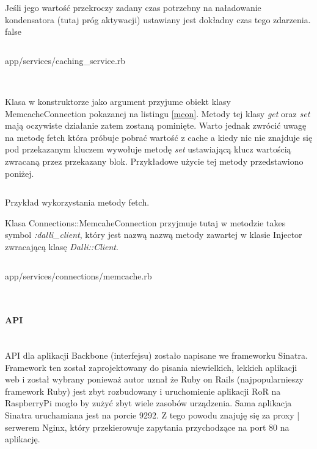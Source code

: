 \documentclass[11pt,a4paper, twoside]{article}
\begin{document}
Jeśli jego wartość przekroczy zadany czas potrzebny na naładowanie kondensatora (tutaj próg aktywacji) ustawiany jest dokładny czas tego zdarzenia. %
\if false
\newpage
\begin{listing}[H]
\inputminted[linenos=true]{ruby}{./src/cachingservice.rb}
\caption{app/services/caching\_service.rb}
$\label{caching}$
\end{listing}
\noindent
Klasa w konstruktorze jako argument przyjume obiekt klasy \mbox{MemcacheConnection} pokazanej na listingu \ref{mcon}. Metody tej klasy \emph{get} oraz \emph{set} mają oczywiste działanie zatem zostaną pominięte. Warto jednak zwrócić uwagę na metodę fetch która próbuje pobrać wartość z cache a kiedy nic nie znajduje się pod przekazanym kluczem wywołuje metodę \emph{set} ustawiającą klucz wartością zwracaną przez przekazany blok. Przykładowe użycie tej metody przedstawiono poniżej.
\begin{listing}
\inputminted[linenos=true]{ruby}{./src/fetch.rb}
\caption{Przykład wykorzystania metody fetch.}
\end{listing}
\newpage
\noindent
Klasa Connections::MemcaheConnection przyjmuje tutaj w metodzie takes symbol \emph{:dalli\_client}, który jest nazwą nazwą metody zawartej w klasie Injector zwracającą klasę \emph{Dalli::Client}.
\begin{listing}
\inputminted[linenos=true]{ruby}{./src/memcache.rb}
\caption{app/services/connections/memcache.rb}
$\label{mcon}$
\end{listing}
\fi
\newpage
\paragraph{API} ~\\
API dla aplikacji Backbone (interfejsu) zostało napisane we frameworku Sinatra. Framework ten został  zaprojektowany do pisania niewielkich, lekkich aplikacji web i został wybrany ponieważ autor uznał że Ruby on Rails (najpopularnieszy framework Ruby) jest zbyt rozbudowany i uruchomienie aplikacji RoR na RaspberryPi mogło by zużyć zbyt wiele zasobów urządzenia. Sama aplikacja Sinatra uruchamiana jest na porcie 9292. Z tego powodu znajuję się za proxy | serwerem Nginx, który przekierowuje zapytania przychodzące na port 80 na aplikację.
\end{document}
